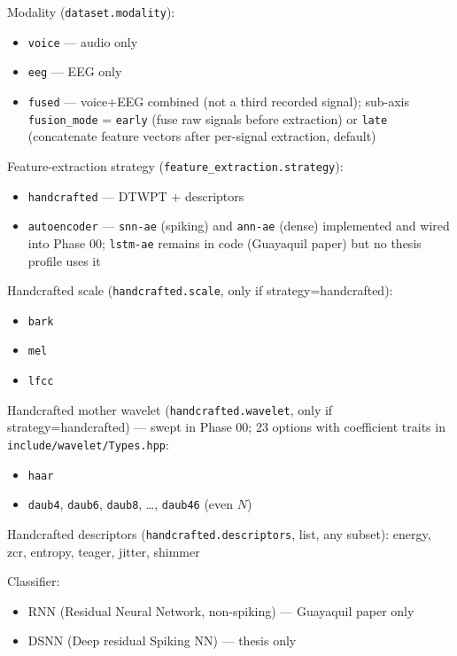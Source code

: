 
Modality (\texttt{dataset.modality}):
\begin{itemize}
    \item \texttt{voice} --- audio only
    \item \texttt{eeg} --- EEG only
    \item \texttt{fused} --- voice+EEG combined (not a third recorded signal); sub-axis
    \texttt{fusion\_mode} = \texttt{early} (fuse raw signals before extraction) or \texttt{late}
    (concatenate feature vectors after per-signal extraction, default)
\end{itemize}

Feature-extraction strategy (\texttt{feature\_extraction.strategy}):
\begin{itemize}
    \item \texttt{handcrafted} --- DTWPT + descriptors
    \item \texttt{autoencoder} --- \texttt{snn-ae} (spiking) and \texttt{ann-ae} (dense) implemented and wired into Phase 00; \texttt{lstm-ae} remains in code (Guayaquil paper) but no thesis profile uses it
\end{itemize}

Handcrafted scale (\texttt{handcrafted.scale}, only if strategy=handcrafted):
\begin{itemize}
    \item \texttt{bark}
    \item \texttt{mel}
    \item \texttt{lfcc}
\end{itemize}

Handcrafted mother wavelet (\texttt{handcrafted.wavelet}, only if strategy=handcrafted) --- swept in Phase 00; 23 options with coefficient traits in \texttt{include/wavelet/Types.hpp}:
\begin{itemize}
    \item \texttt{haar}
    \item \texttt{daub4}, \texttt{daub6}, \texttt{daub8}, \dots, \texttt{daub46} (even $N$)
\end{itemize}

Handcrafted descriptors (\texttt{handcrafted.descriptors}, list, any subset):
energy, zcr, entropy, teager, jitter, shimmer

Classifier:
\begin{itemize}
    \item RNN (Residual Neural Network, non-spiking) --- Guayaquil paper only
    \item DSNN (Deep residual Spiking NN) --- thesis only
\end{itemize}

